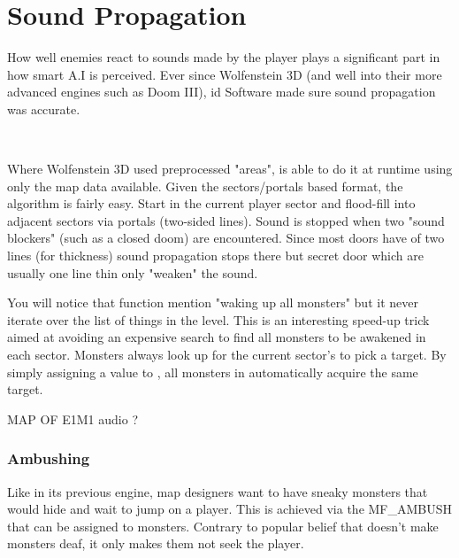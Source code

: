 \section{Sound Propagation}
How well enemies react to sounds made by the player plays a significant part in how smart A.I is perceived.
Ever since Wolfenstein 3D (and well into their more advanced engines such as Doom III), id Software made sure sound propagation was accurate.\\
\par
{}\\
\pagebreak

 Where Wolfenstein 3D used preprocessed "areas", \doom is able to do it at runtime using only the map data available. Given the sectors/portals based format, the algorithm is fairly easy. Start in the current player sector and flood-fill into adjacent sectors via portals (two-sided lines). Sound is stopped when two "sound blockers" (such as a closed doom) are encountered. Since most doors have of two lines (for thickness) sound propagation stops there but secret door which are usually one line thin only "weaken" the sound.\\
\par
You will notice that function  mention "waking up all monsters" but it never iterate over the list of things in the level. This is an interesting speed-up trick aimed at avoiding an expensive search to find all monsters to be awakened in each sector. Monsters always look up for the current sector's  to pick a target. By simply assigning a value to , all monsters in  automatically acquire the same target.\\
\par
MAP OF E1M1 audio ?\\
\vspace{8cm}
\par
\subsubsection{Ambushing}
Like in its previous engine, map designers want to have sneaky monsters that would hide and wait to jump on a player. This is achieved via the MF\_AMBUSH that can be assigned to monsters. Contrary to popular belief that doesn't make monsters deaf, it only makes them not seek the player.\\
\par
